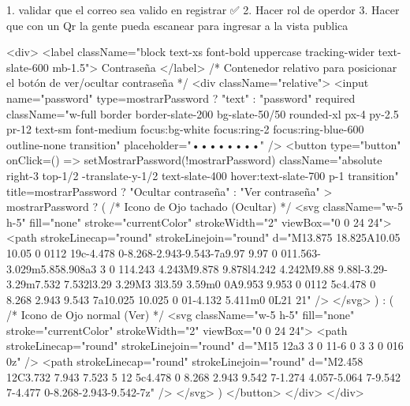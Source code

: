 1. validar que el correo sea valido en registrar ✅
2. Hacer rol de operdor
3. Hacer que con un Qr la gente pueda escanear para ingresar a la vista publica


<div>
                <label className="block text-xs font-bold uppercase tracking-wider text-slate-600 mb-1.5">
                  Contraseña
                </label>
                {/* Contenedor relativo para posicionar el botón de ver/ocultar contraseña */}
                <div className="relative">
                  <input
                    name="password"
                    type={mostrarPassword ? "text" : "password"}
                    required
                    className="w-full border border-slate-200 bg-slate-50/50 rounded-xl px-4 py-2.5 pr-12 text-sm font-medium focus:bg-white focus:ring-2 focus:ring-blue-600 outline-none transition"
                    placeholder="••••••••"
                  />
                  <button
                    type="button"
                    onClick={() => setMostrarPassword(!mostrarPassword)}
                    className="absolute right-3 top-1/2 -translate-y-1/2 text-slate-400 hover:text-slate-700 p-1 transition"
                    title={mostrarPassword ? "Ocultar contraseña" : "Ver contraseña"}
                  >
                    {mostrarPassword ? (
                      /* Icono de Ojo tachado (Ocultar) */
                      <svg className="w-5 h-5" fill="none" stroke="currentColor" strokeWidth="2" viewBox="0 0 24 24">
                        <path strokeLinecap="round" strokeLinejoin="round" d="M13.875 18.825A10.05 10.05 0 0112 19c-4.478 0-8.268-2.943-9.543-7a9.97 9.97 0 011.563-3.029m5.858.908a3 3 0 114.243 4.243M9.878 9.878l4.242 4.242M9.88 9.88l-3.29-3.29m7.532 7.532l3.29 3.29M3 3l3.59 3.59m0 0A9.953 9.953 0 0112 5c4.478 0 8.268 2.943 9.543 7a10.025 10.025 0 01-4.132 5.411m0 0L21 21" />
                      </svg>
                    ) : (
                      /* Icono de Ojo normal (Ver) */
                      <svg className="w-5 h-5" fill="none" stroke="currentColor" strokeWidth="2" viewBox="0 0 24 24">
                        <path strokeLinecap="round" strokeLinejoin="round" d="M15 12a3 3 0 11-6 0 3 3 0 016 0z" />
                        <path strokeLinecap="round" strokeLinejoin="round" d="M2.458 12C3.732 7.943 7.523 5 12 5c4.478 0 8.268 2.943 9.542 7-1.274 4.057-5.064 7-9.542 7-4.477 0-8.268-2.943-9.542-7z" />
                      </svg>
                    )}
                  </button>
                </div>
              </div>
